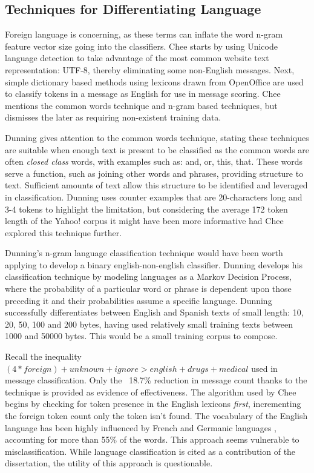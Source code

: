 \documentclass[twoside,11pt]{article}
\begin{document}
\subsection{Techniques for Differentiating Language}
Foreign language is concerning, as these terms can inflate the word n-gram feature vector size going into the classifiers. Chee starts by using Unicode language detection to take advantage of the most common website text representation: UTF-8, thereby eliminating some non-English messages. Next, simple dictionary based methods using lexicons drawn from OpenOffice are used to classify tokens in a message as English for use in message scoring. Chee mentions the common words technique and n-gram based techniques, but dismisses the later as requiring non-existent training data.
\par Dunning \citep{Dunning} gives attention to the common words technique, stating these techniques are suitable when enough text is present to be classified as the common words are often \textit{closed class} words, with examples such as: and, or, this, that. These words serve a function, such as joining other words and phrases, providing structure to text. Sufficient amounts of text allow this structure to be identified and leveraged in classification. Dunning uses counter examples that are 20-characters long and 3-4 tokens to highlight the limitation, but considering the average 172 token length of the Yahoo! corpus it might have been more informative had Chee explored this technique further.
\par Dunning's n-gram language classification technique would have been worth applying to develop a binary english-non-english classifier. Dunning develops his classification technique by modeling languages as a Markov Decision Process, where the probability of a particular word or phrase is dependent upon those preceding it and their probabilities assume a specific language. Dunning successfully differentiates between English and Spanish texts of small length: 10, 20, 50, 100 and 200 bytes, having used relatively small training texts between 1000 and 50000 bytes. This would be a small training corpus to compose.
\par Recall the inequality $(4 * foreign) + unknown + ignore > english + drugs + medical$ used in message classification. Only the ~18.7\% reduction in message count thanks to the technique is provided as evidence of effectiveness. The algorithm used by Chee begins by checking for token presence in the English lexicons \textit{first}, incrementing the foreign token count only the token isn't found. The vocabulary of the English language has been highly influenced by French and Germanic languages \citep{English}, accounting for more than 55\% of the words. This approach seems vulnerable to misclassification. While language classification is cited as a contribution of the dissertation, the utility of this approach is questionable.
\end{document}
